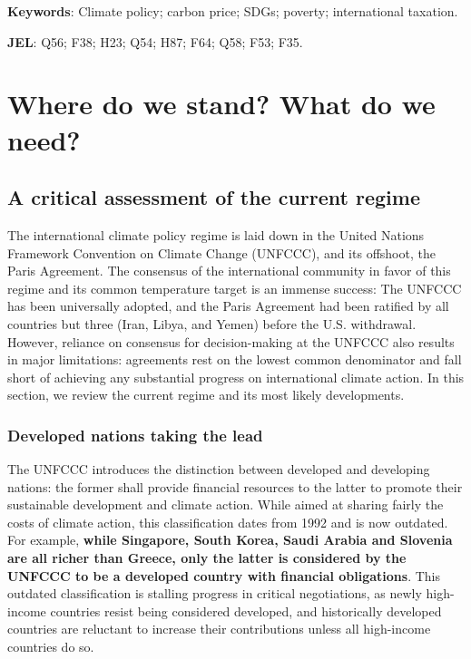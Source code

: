 \documentclass[12pt,english]{article}
\makeatletter
\renewcommand\tableofcontents{%
    \@starttoc{toc}%
}
\makeatother
\begin{document}
\textbf{Keywords}: Climate policy; carbon price; SDGs; poverty; international taxation.

\textbf{JEL}: Q56; F38; H23; Q54; H87; F64; Q58; F53; F35.

\clearpage
\tableofcontents


\clearpage


\section{Where do we stand? What do we need?\label{sec:now}}%


\subsection{A critical assessment of the current regime\label{subsec:criticism}}

The international climate policy regime is laid down in the United Nations Framework Convention on Climate Change (UNFCCC), and its offshoot, the Paris Agreement. The consensus of the international community in favor of this regime and its common  temperature target is an immense success: The UNFCCC has been universally adopted, and the Paris Agreement had been ratified by all countries but three (Iran, Libya, and Yemen) before the U.S. withdrawal. However, reliance on consensus for decision-making at the UNFCCC also results in major limitations: agreements rest on the lowest common denominator and fall short of achieving any substantial progress on international climate action. In this section, we review the current regime and its most likely developments.

\subsubsection{Developed nations taking the lead\label{subsubsec:developed}}
The UNFCCC introduces the distinction between developed and developing nations: the former shall provide financial resources to the latter to promote their sustainable development and climate action. While aimed at sharing fairly the costs of climate action, this classification dates from 1992 and is now outdated. For example, \textbf{while Singapore, South Korea, Saudi Arabia and Slovenia are all richer than Greece, only the latter is considered by the UNFCCC to be a developed country with financial obligations}. This outdated classification is stalling progress in critical negotiations, as newly high-income countries resist being considered developed, and historically developed countries are reluctant to increase their contributions unless all high-income countries do so.
\end{document}
